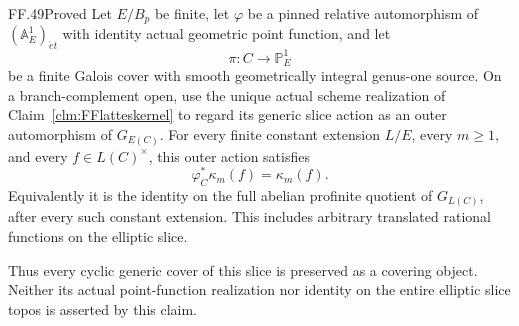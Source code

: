 \begin{claim}{FF.49}{Proved}\label{clm:FFellipticshear}
Let \(E/B_p\) be finite, let \(\varphi\) be a pinned
relative automorphism of \((\mathbb A^1_E)_{\acute et}\)
with identity actual geometric point function, and let
\[
                  \pi:C\longrightarrow\mathbb P^1_E
                                                        \tag{FF.49.1}
\]
be a finite Galois cover with smooth geometrically
integral genus-one source. On a branch-complement open,
use the unique actual scheme realization of
Claim~\ref{clm:FFlatteskernel} to regard its generic
slice action as an outer automorphism of \(G_{E(C)}\).
For every finite constant extension \(L/E\), every
\(m\ge1\), and every \(f\in L(C)^\times\), this
outer action satisfies
\[
                     \varphi_C^*\kappa_m(f)=\kappa_m(f).
                                                        \tag{FF.49.2}
\]
Equivalently it is the identity on the full abelian
profinite quotient of \(G_{L(C)}\), after every such
constant extension. This includes arbitrary translated
rational functions on the elliptic slice.

Thus every cyclic generic cover of this slice is
preserved as a covering object. Neither its actual
point-function realization nor identity on the entire
elliptic slice topos is asserted by this claim.
\end{claim}


